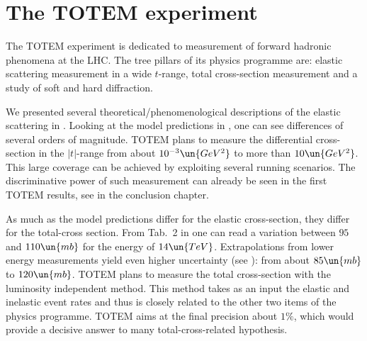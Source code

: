 



\chapter[ttm]{The TOTEM experiment}

The TOTEM experiment  is dedicated to measurement of forward hadronic phenomena at the LHC. The tree pillars of its physics programme are: elastic scattering measurement in a wide $t$-range, total cross-section measurement and a study of soft and hard diffraction.

We presented several theoretical/phenomenological descriptions of the elastic scattering in . Looking at the model predictions in , one can see differences of several orders of magnitude. TOTEM plans to measure the differential cross-section in the $|t|$-range from about $10^{-3}\un{GeV^2}$ to more than $10\un{GeV^2}$. This large coverage can be achieved by exploiting several running scenarios. The discriminative power of such measurement can already be seen in the first TOTEM results, see  in the conclusion chapter.

As much as the model predictions differ for the elastic cross-section, they differ for the total-cross section. From Tab.~2 in  one can read a variation between $95$ and $110\un{mb}$ for the energy of $14\un{TeV}$. Extrapolations from lower energy measurements yield even higher uncertainty (see ): from about $85\un{mb}$ to $120\un{mb}$. TOTEM plans to measure the total cross-section with the luminosity independent method. This method takes as an input the elastic and inelastic event rates and thus is closely related to the other two items of the physics programme. TOTEM aims at the final precision about $1\percent$, which would provide a decisive answer to many total-cross-related hypothesis.

